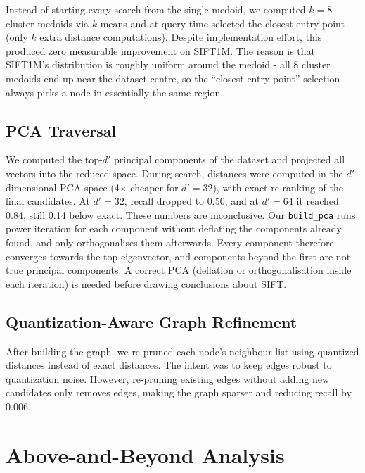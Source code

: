 \documentclass[10pt]{article}
\begin{document}
Instead of starting every search from the single medoid, we computed $k=8$ cluster medoids via $k$-means and at query time selected the closest entry point (only $k$ extra distance computations). Despite implementation effort, this produced zero measurable improvement on SIFT1M. The reason is that SIFT1M's distribution is roughly uniform around the medoid - all 8 cluster medoids end up near the dataset centre, so the ``closest entry point'' selection always picks a node in essentially the same region.

\subsection{PCA Traversal}

We computed the top-$d'$ principal components of the dataset and projected all vectors into the reduced space. During search, distances were computed in the $d'$-dimensional PCA space (4$\times$ cheaper for $d'=32$), with exact re-ranking of the final candidates. At $d'=32$, recall dropped to 0.50, and at $d'=64$ it reached 0.84, still 0.14 below exact. These numbers are inconclusive. Our \texttt{build\_pca} runs power iteration for each component without deflating the components already found, and only orthogonalises them afterwards. Every component therefore converges towards the top eigenvector, and components beyond the first are not true principal components. A correct PCA (deflation or orthogonalisation inside each iteration) is needed before drawing conclusions about SIFT.

\subsection{Quantization-Aware Graph Refinement}

After building the graph, we re-pruned each node's neighbour list using quantized distances instead of exact distances. The intent was to keep edges robust to quantization noise. However, re-pruning existing edges without adding new candidates only removes edges, making the graph sparser and reducing recall by 0.006.

\section{Above-and-Beyond Analysis}
\end{document}
